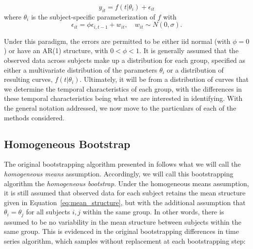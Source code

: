 \begin{equation}\label{eq:mean_structure}
y_{it} = f(t|\theta_i) + \epsilon_{it}
\end{equation}
where $\theta_i$ is the subject-specific parameterization of $f$ with
\begin{equation}
\epsilon_{it} = \phi \epsilon_{i, t-1} + w_{it}, \quad w_{it} \sim N(0, \sigma).
\end{equation}

Under this paradigm, the errors are permitted to be either iid normal (with $\phi = 0$) or have an AR(1) structure, with $0 < \phi < 1$. It is generally assumed that the observed data across subjects make up a distribution for each group, specified as either a multivariate distribution of the parameters $\theta_i$ or a distribution of resulting curves, $f(t|\theta_i)$. Ultimately, it will be from a distribution of curves that we determine the temporal characteristics of each group, with the differences in these temporal characteristics being what we are interested in identifying. With the general notation addressed, we now move to the particulars of each of the methods considered.

\subsection{Homogeneous Bootstrap}

The original bootstrapping algorithm presented in \citet{oleson2017detecting} follows what we will call the \textit{homogeneous means} assumption. Accordingly, we will call this bootstrapping algorithm the \textit{homogeneous bootstrap}. Under the homogeneous means assumption, it is still assumed that observed data for each subject retains the mean structure given in Equation~\ref{eq:mean_structure}, but with the additional assumption that $\theta_i = \theta_j$ for all subjects $i, j$ within the same group. In other words, there is assumed to be no variability in the mean structure between subjects within the same group. This is evidenced in the original bootstrapping differences in time series algorithm, which samples without replacement at each bootstrapping step:


